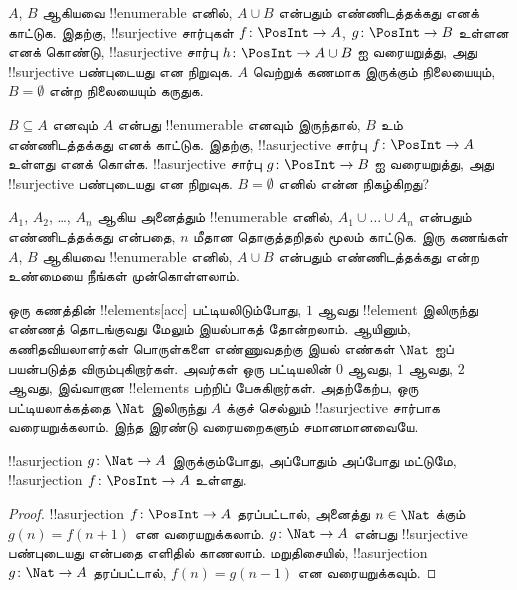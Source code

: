 \documentclass[../../../include/open-logic-section]{subfiles}
\begin{document}
\begin{prob}
$A$, $B$ ஆகியவை !!{enumerable} எனில்,
$A \cup B$ என்பதும் எண்ணிடத்தக்கது எனக் காட்டுக.
இதற்கு, !!{surjective} சார்புகள் $f\colon \PosInt \to
A$, $g\colon \PosInt \to B$ உள்ளன எனக் கொண்டு,
!!a{surjective} சார்பு $h\colon \PosInt \to A \cup B$ ஐ
வரையறுத்து, அது !!{surjective} பண்புடையது என நிறுவுக.
$A$ வெற்றுக் கணமாக இருக்கும் நிலையையும்,
$B = \emptyset$ என்ற நிலையையும் கருதுக.
\end{prob}

\begin{prob}
$B \subseteq A$ எனவும் $A$ என்பது !!{enumerable} எனவும் இருந்தால்,
$B$ உம் எண்ணிடத்தக்கது எனக் காட்டுக.
இதற்கு, !!a{surjective} சார்பு $f\colon \PosInt \to
A$ உள்ளது எனக் கொள்க.
!!a{surjective} சார்பு $g\colon \PosInt \to B$ ஐ வரையறுத்து,
அது !!{surjective} பண்புடையது என நிறுவுக.
$B = \emptyset$ எனில் என்ன நிகழ்கிறது?
\end{prob}

\begin{prob}
$A_1$, $A_2$, \dots, $A_n$ ஆகிய அனைத்தும் !!{enumerable} எனில்,
$A_1 \cup \dots \cup A_n$ என்பதும் எண்ணிடத்தக்கது என்பதை,
$n$ மீதான தொகுத்தறிதல் மூலம் காட்டுக.
இரு கணங்கள் $A$, $B$ ஆகியவை !!{enumerable} எனில்,
$A \cup
B$ என்பதும் எண்ணிடத்தக்கது என்ற உண்மையை நீங்கள் முன்கொள்ளலாம்.
\end{prob}

ஒரு கணத்தின் !!{element}s[acc] பட்டியலிடும்போது,
$1$ ஆவது !!{element} இலிருந்து எண்ணத் தொடங்குவது மேலும்
இயல்பாகத் தோன்றலாம். ஆயினும், கணிதவியலாளர்கள் பொருள்களை
எண்ணுவதற்கு இயல் எண்கள் $\Nat$ ஐப் பயன்படுத்த விரும்புகிறார்கள்.
அவர்கள் ஒரு பட்டியலின் $0$ ஆவது, $1$ ஆவது, $2$ ஆவது,
இவ்வாறான !!{element}s பற்றிப் பேசுகிறார்கள்.
அதற்கேற்ப, ஒரு பட்டியலாக்கத்தை $\Nat$ இலிருந்து $A$ க்குச் செல்லும்
!!a{surjective} சார்பாக வரையறுக்கலாம்.
இந்த இரண்டு வரையறைகளும் சமானமானவையே.

\begin{prop}
!!a{surjection} $g\colon \Nat \to A$ இருக்கும்போது,
அப்போதும் அப்போது மட்டுமே,
!!a{surjection} $f\colon \PosInt \to A$ உள்ளது.
\end{prop}

\begin{proof}
!!a{surjection} $f\colon \PosInt \to A$ தரப்பட்டால்,
அனைத்து $n \in \Nat$ க்கும் $g(n) =
f(n+1)$ என வரையறுக்கலாம்.
$g\colon \Nat
\to A$ என்பது !!{surjective} பண்புடையது என்பதை எளிதில் காணலாம்.
மறுதிசையில், !!a{surjection} $g\colon
\Nat \to A$ தரப்பட்டால், $f(n) = g(n-1)$ என வரையறுக்கவும்.
\end{proof}
\end{document}
